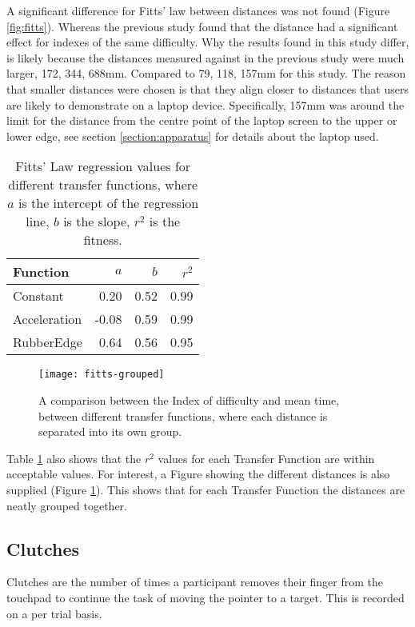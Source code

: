 A significant difference for Fitts' law between distances was not found (Figure \ref{fig:fitts}). Whereas the previous study\cite{Casiez2007RubberEdge} found that the distance had a significant effect for indexes of the same difficulty. Why the results found in this study differ, is likely because the distances measured against in the previous study were much larger, 172, 344, 688mm. Compared to 79, 118, 157mm for this study. The reason that smaller distances were chosen is that they align closer to distances that users are likely to demonstrate on a laptop device. Specifically, 157mm was around the limit for the distance from the centre point of the laptop screen to the upper or lower edge, see section \ref{section:apparatus} for details about the laptop used. 

\begin{table}[h]
\centering
{
\begin{tabular}{ l r r r } 
 Function & $a$ & $b$ & $r^2$ \\ 
 \hline
 Constant & 0.20 & 0.52 & 0.99 \\ 
 Acceleration & -0.08 & 0.59 & 0.99 \\ 
 RubberEdge & 0.64 & 0.56 & 0.95 \\
 \hline
 \end{tabular}
}
\vspace{0.5cm}
 \caption{Fitts' Law regression values for different transfer functions, where $a$ is the intercept of the regression line, $b$ is the slope, $r^2$ is the fitness.}
\label{table:fitts}
\end{table}

\begin{figure}[h]
    \centering
    \texttt{[image: fitts-grouped]}
    \caption{A comparison between the Index of difficulty and mean time, between different transfer functions, where each distance is separated into its own group.}
    \label{fig:fitts-grouped}
\end{figure}


Table \ref{table:fitts} also shows that the $r^2$ values for each Transfer Function are within acceptable values. For interest, a Figure showing the different distances is also supplied (Figure \ref{fig:fitts-grouped}). This shows that for each Transfer Function the distances are neatly grouped together.

\subsection{Clutches}
Clutches are the number of times a participant removes their finger from the touchpad to continue the task of moving the pointer to a target. This is recorded on a per trial basis.

